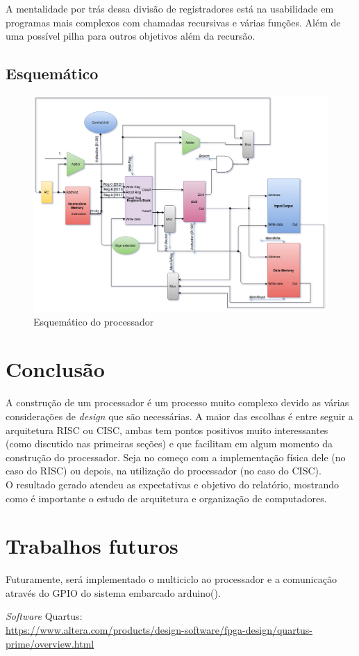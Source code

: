 \documentclass[a4paper, 12pt]{article}
\begin{document}
A mentalidade por trás dessa divisão de registradores está na usabilidade em programas mais complexos com chamadas recursivas e várias funções. Além de uma possível pilha para outros objetivos além da recursão.

\subsection{Esquemático}
\begin{landscape}
\begin{figure}[htp]
	\includegraphics[scale=0.5]{LABAOC.png}
	\caption{Esquemático do processador}
\end{figure}
\end{landscape}

\newpage

\section{Conclusão}
A construção de um processador é um processo muito complexo devido as várias considerações de \textit{design} que são necessárias. A maior das escolhas é entre seguir a arquitetura RISC ou CISC, ambas tem pontos positivos muito interessantes (como discutido nas primeiras seções) e que facilitam em algum momento da construção do processador. Seja no começo com a implementação física dele (no caso do RISC) ou depois, na utilização do processador (no caso do CISC).\\
O resultado gerado atendeu as expectativas e objetivo do relatório, mostrando como é importante o estudo de arquitetura e organização de computadores.

\section{Trabalhos futuros}
Futuramente, será implementado o multiciclo ao processador e a comunicação através do GPIO do sistema embarcado arduino(\cite{arduino}).

\begin{thebibliography}{9}

  \textit{Software} Quartus:\\
  \url{https://www.altera.com/products/design-software/fpga-design/quartus-prime/overview.html}

\end{thebibliography}
\end{document}
